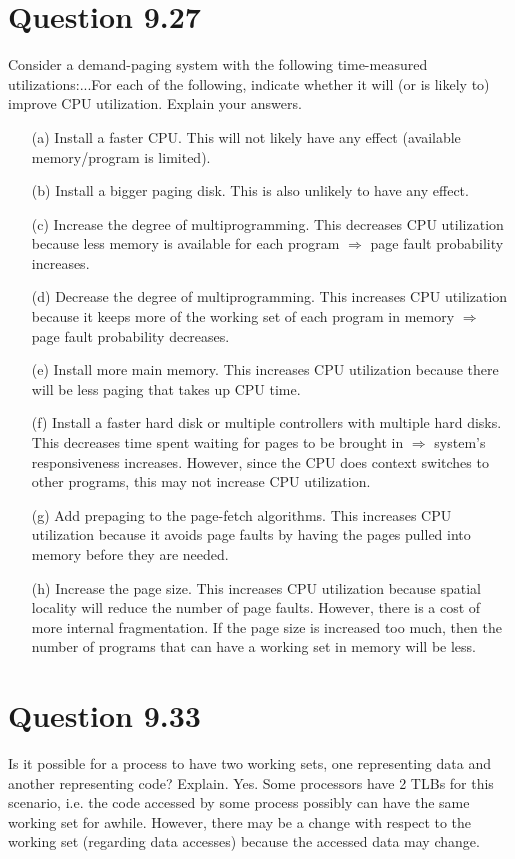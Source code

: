 \documentclass[12pt]{article}
\begin{document}
\section*{Question 9.27}{\color{blue}Consider a demand-paging system with the following time-measured utilizations:...For each of the following, indicate whether it will (or is likely to) improve CPU utilization. Explain your answers.
\begin{enumerate}
\item[(a)]Install a faster CPU. {\color{black}This will not likely have any effect (available memory/program is limited). 
}
\item[(b)]Install a bigger paging disk. {\color{black}This is also  unlikely to have any effect.
}
\item[(c)]Increase the degree of multiprogramming. {\color{black}This decreases CPU utilization because less memory is available for each program $\Rightarrow$ page fault probability increases.
}
\item[(d)]Decrease the degree of multiprogramming. {\color{black}This increases CPU utilization because it keeps more of the working set of each program in memory $\Rightarrow$ page fault probability decreases.
}
\item[(e)]Install more main memory. {\color{black}This increases CPU utilization because there will be less paging that takes up CPU time.
}
\item[(f)]Install a faster hard disk or multiple controllers with multiple hard disks. {\color{black}This decreases time spent waiting for pages to be brought in $\Rightarrow$ system's responsiveness increases. However, since the CPU does context switches to other programs, this may not increase CPU utilization.
}
\item[(g)]Add prepaging to the page-fetch algorithms. {\color{black}This increases CPU utilization because it avoids page faults by having the pages pulled into memory before they are needed.
}
\item[(h)]Increase the page size. {\color{black}This increases CPU utilization because spatial locality will reduce the number of page faults. However, there is a cost of more internal fragmentation. If the page size is increased too much, then the number of programs that can have a working set in memory will be less.
}
\end{enumerate}

}

\section*{Question 9.33}{\color{blue}Is it possible for a process to have two working sets, one representing data and another representing code? Explain.} Yes. Some processors have 2 TLBs for this scenario, i.e. the code accessed by some process possibly can have the same working set for awhile. However, there may be a change with respect to the working set (regarding data accesses) because the accessed data may change.
\end{document}
